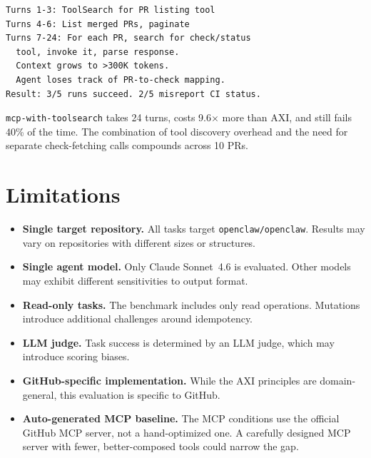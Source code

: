 \documentclass{article}
\begin{document}
\begin{lstlisting}[caption={\texttt{mcp-with-toolsearch}: 24 turns, \$0.614, 136s (FAIL 3/5).}]
Turns 1-3: ToolSearch for PR listing tool
Turns 4-6: List merged PRs, paginate
Turns 7-24: For each PR, search for check/status
  tool, invoke it, parse response.
  Context grows to >300K tokens.
  Agent loses track of PR-to-check mapping.
Result: 3/5 runs succeed. 2/5 misreport CI status.
\end{lstlisting}

\texttt{mcp-with-toolsearch} takes 24 turns, costs 9.6$\times$ more than AXI, and still
fails 40\% of the time. The combination of tool discovery overhead and
the need for separate check-fetching calls compounds across 10 PRs.

\section{Limitations}
\label{sec:limitations}

\begin{itemize}
  \item \textbf{Single target repository.} All tasks target
    \texttt{openclaw/openclaw}. Results may vary on repositories with
    different sizes or structures.
  \item \textbf{Single agent model.} Only Claude Sonnet~4.6 is evaluated.
    Other models may exhibit different sensitivities to output format.
  \item \textbf{Read-only tasks.} The benchmark includes only read operations.
    Mutations introduce additional challenges around idempotency.
  \item \textbf{LLM judge.} Task success is determined by an LLM judge,
    which may introduce scoring biases.
  \item \textbf{GitHub-specific implementation.} While the AXI principles
    are domain-general, this evaluation is specific to GitHub.
  \item \textbf{Auto-generated MCP baseline.} The MCP conditions use the
    official GitHub MCP server, not a hand-optimized one. A carefully designed
    MCP server with fewer, better-composed tools could narrow the gap.
\end{itemize}

\end{document}

